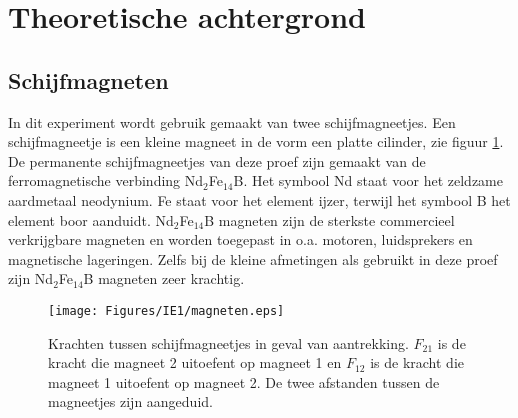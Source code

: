 \section{Theoretische achtergrond}
\subsection{Schijfmagneten}
In dit experiment wordt gebruik gemaakt van twee schijfmagneetjes. Een schijfmagneetje is een kleine magneet in de vorm een platte cilinder, zie figuur \ref{fig:magneten}. De permanente schijfmagneetjes van deze proef zijn gemaakt van de ferromagnetische verbinding Nd$_2$Fe$_{14}$B. Het symbool Nd staat voor het zeldzame aardmetaal neodynium. Fe staat voor het element ijzer, terwijl het symbool B het element boor aanduidt. Nd$_2$Fe$_{14}$B magneten zijn de sterkste commercieel verkrijgbare magneten en worden toegepast in o.a. motoren, luidsprekers en magnetische lageringen. Zelfs bij de kleine afmetingen als gebruikt in deze proef zijn Nd$_2$Fe$_{14}$B magneten zeer krachtig.
%
\begin{figure}[h!]
    \centering
    \texttt{[image: Figures/IE1/magneten.eps]}
    \caption{Krachten tussen schijfmagneetjes in geval van aantrekking. $F_{21}$  is de kracht die magneet 2 uitoefent op magneet 1 en $F_{12}$ is de kracht die magneet 1 uitoefent op magneet 2. De twee afstanden tussen de magneetjes zijn aangeduid.}
    \label{fig:magneten}
\end{figure}
%

